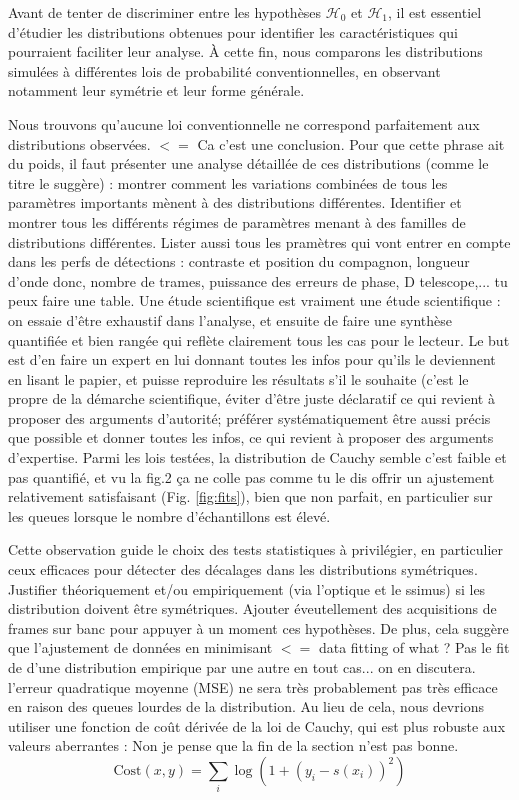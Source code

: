 \documentclass{article}
\newcommand{\dm}[1]{{\color{mulberry} #1}}
\begin{document}
Avant de tenter de discriminer entre les hypothèses $\mathcal{H}_0$ et $\mathcal{H}_1$, il est essentiel d'étudier les distributions obtenues pour identifier les caractéristiques qui pourraient faciliter leur analyse. À cette fin, nous comparons les distributions simulées à différentes lois de probabilité conventionnelles, en observant notamment leur symétrie et leur forme générale.

Nous trouvons qu'aucune loi conventionnelle ne correspond parfaitement aux distributions observées. \dm{$<=$ Ca c'est une conclusion. Pour que cette phrase ait du poids, il faut présenter une analyse détaillée de ces distributions (comme le titre le suggère) : montrer comment les variations combinées de tous les paramètres importants mènent à des distributions différentes. Identifier et montrer tous les différents régimes de paramètres menant à des familles de distributions différentes. Lister aussi tous les pramètres qui vont entrer en compte dans les perfs de détections : contraste et position du compagnon, longueur d'onde donc, nombre de trames, puissance des erreurs de phase, D telescope,... tu peux faire une table. Une étude scientifique est vraiment une étude scientifique : on essaie d'être exhaustif dans l'analyse, et ensuite de faire une synthèse quantifiée et bien rangée qui reflète clairement tous les cas pour le lecteur. Le but est d'en faire un expert en lui donnant toutes les infos pour qu'ils le deviennent en lisant le papier, et puisse reproduire les résultats s'il le souhaite (c'est le propre de la démarche scientifique, éviter d'être juste déclaratif ce qui revient à proposer des arguments d'autorité; préférer systématiquement être aussi précis que possible et donner toutes les infos, ce qui revient à proposer des arguments d'expertise.} Parmi les lois testées, la distribution de Cauchy semble \dm{c'est faible et pas quantifié, et vu la fig.2 ça ne colle pas comme tu le dis} offrir un ajustement relativement satisfaisant (Fig. \ref{fig:fits}), bien que non parfait, en particulier sur les queues lorsque le nombre d'échantillons est élevé.

Cette observation guide le choix des tests statistiques à privilégier, en particulier ceux efficaces pour détecter des décalages dans les distributions symétriques.\dm{Justifier théoriquement et/ou empiriquement (via l'optique et le ssimus) si les distribution doivent être symétriques. Ajouter éveutellement des acquisitions de frames sur banc pour appuyer à un moment ces hypothèses. } De plus, cela suggère que l'ajustement de données en minimisant \dm{$<=$ data fitting of what ? Pas le fit de d'une distribution empirique par une autre en tout cas... on en discutera. } l'erreur quadratique moyenne (MSE) ne sera très probablement pas très efficace en raison des queues lourdes de la distribution. Au lieu de cela, nous devrions utiliser une fonction de coût dérivée de la loi de Cauchy, qui est plus robuste aux valeurs aberrantes :\dm{Non je pense que la fin de la section n'est pas bonne.}
\begin{equation}
    \text{Cost}(x, y) = \sum_i \log \left( 1 + \left( y_i - s(x_i )\right)^2 \right)
\end{equation}
\end{document}

